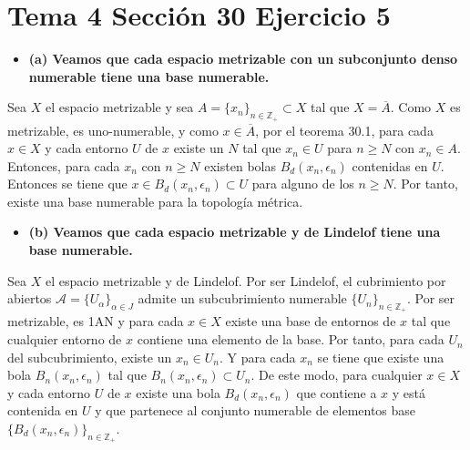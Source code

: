 \documentclass{article}
\begin{document}
\section{Tema 4 Sección 30 Ejercicio 5}
\begin{itemize}
\item \bf (a) \rm Veamos que cada espacio metrizable con un subconjunto denso numerable tiene una base numerable.
\end{itemize}
Sea $X$ el espacio metrizable y sea $A=\{x_n\}_{n\in \mathbb{Z}_+}\subset X$ tal que $X=\overline{A}$. Como $X$ es metrizable, es uno-numerable, y como $x\in \overline{A}$, por el teorema 30.1, para cada $x\in X$ y cada entorno $U$ de $x$ existe un $N$ tal que $x_n\in U$ para $n\geq N$ con $x_n\in A$. Entonces, para cada $x_n$ con $n\geq N$ existen bolas $B_d(x_n,\epsilon_n)$ contenidas en $U$. Entonces se tiene que $x\in B_d(x_n, \epsilon_n)\subset U$ para alguno de los $n\geq N$. Por tanto, existe una base numerable para la topología métrica.
\begin{itemize}
\item \bf (b) \rm Veamos que cada espacio metrizable y de Lindelof tiene una base numerable.
\end{itemize}
Sea $X$ el espacio metrizable y de Lindelof. Por ser Lindelof, el cubrimiento por abiertos $\mathcal{A}=\{U_\alpha\}_{\alpha\in J}$ admite un subcubrimiento numerable $\{U_n\}_{n\in \mathbb{Z}_+}$. Por ser metrizable, es 1AN y para cada $x\in X$ existe una base de entornos de $x$ tal que cualquier entorno de $x$ contiene una elemento de la base. Por tanto, para cada $U_n$ del subcubrimiento, existe un $x_n\in U_n$. Y para cada $x_n$ se tiene que existe una bola $B_n(x_n,\epsilon_n)$ tal que $ B_n(x_n,\epsilon_n)\subset U_n$. De este modo, para cualquier $x\in X$ y cada entorno $U$ de $x$ existe una bola $B_d(x_n,\epsilon_n)$ que contiene a $x$ y está contenida en $U$ y que partenece al conjunto numerable de elementos base $\{B_d(x_n,\epsilon_n)\}_{n\in \mathbb{Z}_+}$.
\end{document}
